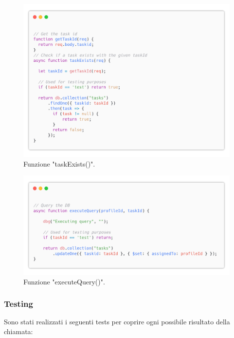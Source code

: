 \documentclass{report}
\begin{document}
\begin{figure}[H]
	\centering\includegraphics[width=1\textwidth]{images/code_task_exists.png}
	Funzione "taskExists()".
\end{figure}
\begin{figure}[H]
	\centering\includegraphics[width=1\textwidth]{images/code_scegli_task_query.png}
	Funzione "executeQuery()".
\end{figure}

\subsubsection*{Testing}

Sono stati realizzati i seguenti tests per coprire ogni possibile risultato della chiamata:
\end{document}
